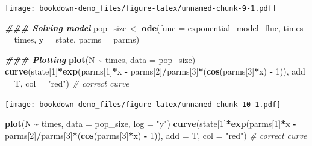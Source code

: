 \documentclass[
]{book}
\newenvironment{Shaded}{\begin{snugshade}}{\end{snugshade}}
\newcommand{\AttributeTok}[1]{\textcolor[rgb]{0.13,0.29,0.53}{#1}}
\newcommand{\CommentTok}[1]{\textcolor[rgb]{0.56,0.35,0.01}{\textit{#1}}}
\newcommand{\DecValTok}[1]{\textcolor[rgb]{0.00,0.00,0.81}{#1}}
\newcommand{\DocumentationTok}[1]{\textcolor[rgb]{0.56,0.35,0.01}{\textbf{\textit{#1}}}}
\newcommand{\FunctionTok}[1]{\textcolor[rgb]{0.13,0.29,0.53}{\textbf{#1}}}
\newcommand{\NormalTok}[1]{#1}
\newcommand{\OtherTok}[1]{\textcolor[rgb]{0.56,0.35,0.01}{#1}}
\newcommand{\SpecialCharTok}[1]{\textcolor[rgb]{0.81,0.36,0.00}{\textbf{#1}}}
\newcommand{\StringTok}[1]{\textcolor[rgb]{0.31,0.60,0.02}{#1}}
\begin{document}
\texttt{[image: bookdown-demo\_files/figure-latex/unnamed-chunk-9-1.pdf]}

\begin{Shaded}
\begin{Highlighting}[]
\DocumentationTok{\#\#\# Solving model}
\NormalTok{pop\_size }\OtherTok{\textless{}{-}} \FunctionTok{ode}\NormalTok{(}\AttributeTok{func =}\NormalTok{ exponential\_model\_fluc, }\AttributeTok{times =}\NormalTok{ times, }\AttributeTok{y =}\NormalTok{ state, }\AttributeTok{parms =}\NormalTok{ parms)}

\DocumentationTok{\#\#\# Plotting}
\FunctionTok{plot}\NormalTok{(N }\SpecialCharTok{\textasciitilde{}}\NormalTok{ times, }\AttributeTok{data =}\NormalTok{ pop\_size)}
\FunctionTok{curve}\NormalTok{(state[}\DecValTok{1}\NormalTok{]}\SpecialCharTok{*}\FunctionTok{exp}\NormalTok{(parms[}\DecValTok{1}\NormalTok{]}\SpecialCharTok{*}\NormalTok{x }\SpecialCharTok{{-}}\NormalTok{ parms[}\DecValTok{2}\NormalTok{]}\SpecialCharTok{/}\NormalTok{parms[}\DecValTok{3}\NormalTok{]}\SpecialCharTok{*}\NormalTok{(}\FunctionTok{cos}\NormalTok{(parms[}\DecValTok{3}\NormalTok{]}\SpecialCharTok{*}\NormalTok{x) }\SpecialCharTok{{-}} \DecValTok{1}\NormalTok{)), }\AttributeTok{add =}\NormalTok{ T, }\AttributeTok{col =} \StringTok{"red"}\NormalTok{) }\CommentTok{\# correct curve}
\end{Highlighting}
\end{Shaded}

\texttt{[image: bookdown-demo\_files/figure-latex/unnamed-chunk-10-1.pdf]}

\begin{Shaded}
\begin{Highlighting}[]
\FunctionTok{plot}\NormalTok{(N }\SpecialCharTok{\textasciitilde{}}\NormalTok{ times, }\AttributeTok{data =}\NormalTok{ pop\_size, }\AttributeTok{log =} \StringTok{"y"}\NormalTok{)}
\FunctionTok{curve}\NormalTok{(state[}\DecValTok{1}\NormalTok{]}\SpecialCharTok{*}\FunctionTok{exp}\NormalTok{(parms[}\DecValTok{1}\NormalTok{]}\SpecialCharTok{*}\NormalTok{x }\SpecialCharTok{{-}}\NormalTok{ parms[}\DecValTok{2}\NormalTok{]}\SpecialCharTok{/}\NormalTok{parms[}\DecValTok{3}\NormalTok{]}\SpecialCharTok{*}\NormalTok{(}\FunctionTok{cos}\NormalTok{(parms[}\DecValTok{3}\NormalTok{]}\SpecialCharTok{*}\NormalTok{x) }\SpecialCharTok{{-}} \DecValTok{1}\NormalTok{)), }\AttributeTok{add =}\NormalTok{ T, }\AttributeTok{col =} \StringTok{"red"}\NormalTok{) }\CommentTok{\# correct curve}
\end{Highlighting}
\end{Shaded}
\end{document}
